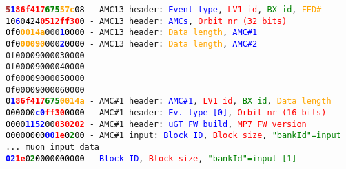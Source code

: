 \texttt{\textcolor{brown}{\textbf{5}}\textcolor{blue}{\textbf{1}}\textcolor{red}{\textbf{86f417}}\textcolor{green}{\textbf{675}}\textcolor{orange}{\textbf{57c}}\textcolor{black}{08} - AMC13 header: \textcolor{blue}{Event type}, \textcolor{red}{LV1 id}, \textcolor{green}{BX id}, \textcolor{orange}{FED\#}}\\
\texttt{\textcolor{black}{10}\textcolor{blue}{\textbf{6}}\textcolor{black}{0424}\textcolor{red}{\textbf{0512ff30}}\textcolor{black}{0} - AMC13 header: \textcolor{blue}{AMCs}, \textcolor{red}{Orbit nr (32 bits)}}\\
\texttt{\textcolor{black}{0f0}\textcolor{orange}{\textbf{0014a}}\texttt{000}\textcolor{blue}{\textbf{1}}\textcolor{black}{0000} - AMC13 header: \textcolor{orange}{Data length}, \textcolor{blue}{AMC\#1}}\\
\texttt{\textcolor{black}{0f0}\textcolor{orange}{\textbf{00090}}\texttt{000}\textcolor{blue}{\textbf{2}}\textcolor{black}{0000} - AMC13 header: \textcolor{orange}{Data length}, \textcolor{blue}{AMC\#2}}\\
\texttt{0f00009000030000}\\
\texttt{0f00009000040000}\\
\texttt{0f00009000050000}\\
\texttt{0f00009000060000}\\
\texttt{\textcolor{black}{0}\textcolor{blue}{\textbf{1}}\textcolor{red}{\textbf{86f417}}\textcolor{green}{\textbf{675}}\textcolor{orange}{\textbf{0014a}} - AMC\#1 header: \textcolor{blue}{AMC\#1}, \textcolor{red}{LV1 id}, \textcolor{green}{BX id}, \textcolor{orange}{Data length}}\\
\texttt{\textcolor{black}{000000}\textcolor{blue}{\textbf{c0}}\textcolor{red}{\textbf{ff30}}\textcolor{black}{0000} - AMC\#1 header: \textcolor{blue}{Ev. type [0]}, \textcolor{red}{Orbit nr (16 bits)}}\\
\texttt{\textcolor{black}{0000}\textcolor{blue}{\textbf{1152}}\textcolor{black}{00}\textcolor{red}{\textbf{030202}} - AMC\#1 header: \textcolor{blue}{uGT FW build}, \textcolor{red}{MP7 FW version}}\\
\texttt{\textcolor{black}{00000000}\textcolor{blue}{\textbf{00}}\textcolor{red}{\textbf{1e}}\textcolor{black}{0}\textcolor{green}{\textbf{2}}\textcolor{black}{00} - AMC\#1 input: \textcolor{blue}{Block ID}, \textcolor{red}{Block size}, \textcolor{green}{"bankId"=input}}\\
\texttt{... muon input data}\\
\texttt{\textcolor{blue}{\textbf{02}}\textcolor{red}{\textbf{1e}}\textcolor{black}{0}\textcolor{green}{\textbf{2}}\textcolor{black}{0000000000} - \textcolor{blue}{Block ID}, \textcolor{red}{Block size}, \textcolor{green}{"bankId"=input [1]}}\\
